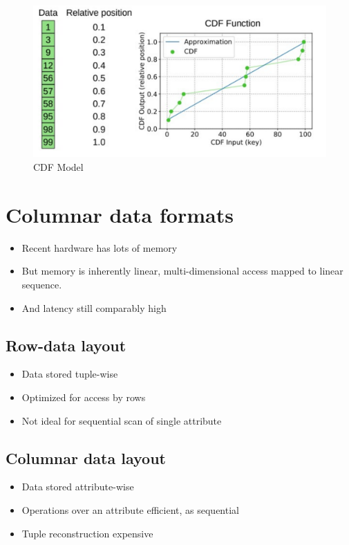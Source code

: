 \documentclass[a4paper]{scrreprt}
\begin{document}
\begin{figure}
		\centering
		\includegraphics[width=\textwidth]{resources/09_cdf}
		\caption{CDF Model}
		\label{fig:cdf}
\end{figure}

\chapter{Columnar data formats}

\begin{itemize}
		\item Recent hardware has lots of memory
		\item But memory is inherently linear, multi-dimensional access mapped to linear sequence.
		\item And latency still comparably high
\end{itemize}

\section{Row-data layout}

\begin{itemize}
		\item Data stored tuple-wise
		\item Optimized for access by rows
		\item Not ideal for sequential scan of single attribute
\end{itemize}

\section{Columnar data layout}

\begin{itemize}
		\item Data stored attribute-wise
		\item Operations over an attribute efficient, as sequential
		\item Tuple reconstruction expensive
\end{itemize}
\end{document}
